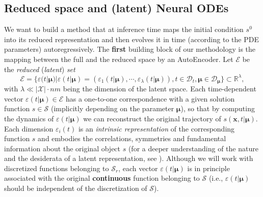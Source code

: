 \subsection{Reduced space and (latent) Neural ODEs}
\label{subsec:AE&NODE}
We want to build a method that at inference time maps the initial condition $s^0$ into its reduced representation and then evolves it in time (according to the PDE parameters) autoregressively.
The \textbf{first} building block of our methodology is the mapping between the full and the reduced space by an AutoEncoder. Let $\mathcal{E}$ be the \textit{reduced} (\textit{latent}) \textit{set}
\begin{equation}
    \mathcal{E}=\{\varepsilon(t|\pmb{\mu})|\varepsilon(t|\pmb{\mu})=
    (\varepsilon_1(t|\pmb{\mu}), \cdots,\varepsilon_{\lambda}(t|\pmb{\mu})), t\in\mathcal{D}_t, \pmb{\mu}\in\mathcal{D}_{\pmb{\mu}}\}\subset{\mathbb{R}^{\lambda}},
\end{equation}
with $\lambda\ll|\mathcal{X}|\cdot nm$ being the dimension of the latent space. Each time-dependent vector $\varepsilon(t|\pmb{\mu})\in\mathcal{E}$ has a one-to-one correspondence with a given solution function $s\in\mathcal{S}$ (implicitly depending on the parameter $\pmb{\mu}$), so that by computing the dynamics of $\varepsilon(t|\pmb{\mu})$ we can reconstruct the original trajectory of $s(\mathbf{x},t|\pmb{\mu})$. Each dimension $\varepsilon_i(t)$ is an \textit{intrinsic representation} of the corresponding function $s$ and embodies the correlations, symmetries and fundamental information about the original object $s$ (for a deeper understanding of the nature and the desiderata of a latent representation, see \cite{Eastwood2018AFF, Higgins2018TowardsAD}). Although we will work with discretized functions belonging to $\mathcal{S}_r$, each vector $\varepsilon(t|\pmb{\mu})$ is in principle associated with the original \textbf{continuous} function belonging to $\mathcal{S}$ (i.e., $\varepsilon(t|\pmb{\mu})$ should be independent of the discretization of $\mathcal{S}$).

